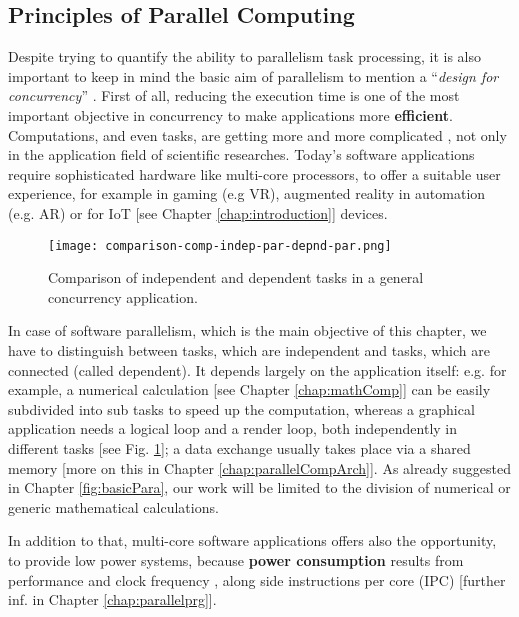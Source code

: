 \newpage

\subsection{Principles of Parallel Computing}\label{chap:parallelPrinciples}

Despite trying to quantify the ability to parallelism task processing, it is also important to keep in mind the basic aim of parallelism to mention a ``\textit{design for concurrency}'' \parencite[see][p4]{article6}. First of all, reducing the execution time is one of the most important objective in concurrency to make applications more \textbf{efficient}. Computations, and even tasks, are getting more and more complicated \parencite{internet2}, not only in the application field of scientific researches. Today's software applications require sophisticated hardware like multi-core processors, to offer a suitable user experience, for example in gaming (e.g VR), augmented reality in automation (e.g. AR) or for IoT [see Chapter \ref{chap:introduction}] devices.

\begin{figure}[h!]
	\centering
	\texttt{[image: comparison-comp-indep-par-depnd-par.png]}
	\caption{
		Comparison of independent and dependent tasks in a general concurrency application.
	}
	\label{fig:compIndeDepConcurr}
\end{figure}

In case of software parallelism, which is the main objective of this chapter, we have to distinguish between tasks, which are independent and tasks, which are connected (called dependent). It depends largely on the application itself: e.g. for example, a numerical calculation [see Chapter \ref{chap:mathComp}] can be easily subdivided into sub tasks to speed up the computation, whereas a graphical application needs a logical loop and a render loop, both independently in different tasks [see Fig. \ref{fig:compIndeDepConcurr}]; a data exchange usually takes place via a shared memory [more on this in Chapter \ref{chap:parallelCompArch}]. As already suggested in Chapter \ref{fig:basicPara}, our work will be limited to the division of numerical or generic mathematical calculations. 

In addition to that, multi-core software applications offers also the opportunity, to provide low power systems, because \textbf{power consumption} results from performance and clock frequency \parencite[see][Fig. 3, p4]{article14}, along side instructions per core (IPC) \parencite{inproceedings4} [further inf. in Chapter \ref{chap:parallelprg}].

